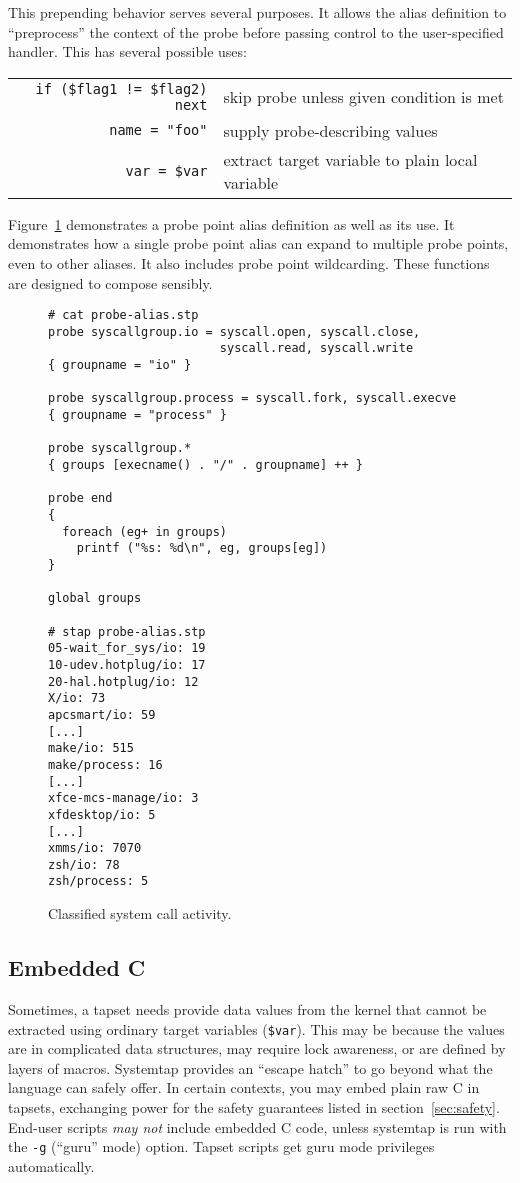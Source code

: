 \documentclass{article}
\newenvironment{boxedminipage}%
    {\begin{makeimage}\begin{center}\begin{Sbox}\begin{minipage}}%
    {\end{minipage}\end{Sbox}\fbox{\TheSbox}\end{center}\end{makeimage}}
\renewcommand{\nomenclature}[2]{}
\begin{document}
This prepending behavior serves several purposes.  It allows the alias
definition to ``preprocess'' the context of the probe before passing
control to the user-specified handler.  This has several possible uses:
\begin{tabular}{rl}
\verb+if ($flag1 != $flag2) next+ & skip probe unless given condition is met \\
\verb+name = "foo"+ & supply probe-describing values \\
\verb+var = $var+ & extract target variable to plain local variable \\ %
\end{tabular}

Figure~\ref{fig:probe-alias} demonstrates a probe point alias
definition as well as its use.  It demonstrates how a single probe
point alias can expand to multiple probe points, even to other
aliases.  It also includes probe point wildcarding.  These functions
are designed to compose sensibly.

\begin{figure}[!ht]
\begin{boxedminipage}{4.5in}
\begin{verbatim}
# cat probe-alias.stp
probe syscallgroup.io = syscall.open, syscall.close, 
                        syscall.read, syscall.write
{ groupname = "io" }

probe syscallgroup.process = syscall.fork, syscall.execve
{ groupname = "process" }

probe syscallgroup.* 
{ groups [execname() . "/" . groupname] ++ }

probe end
{
  foreach (eg+ in groups)
    printf ("%s: %d\n", eg, groups[eg])
}

global groups

# stap probe-alias.stp
05-wait_for_sys/io: 19
10-udev.hotplug/io: 17
20-hal.hotplug/io: 12
X/io: 73
apcsmart/io: 59
[...]
make/io: 515
make/process: 16
[...]
xfce-mcs-manage/io: 3
xfdesktop/io: 5
[...]
xmms/io: 7070
zsh/io: 78
zsh/process: 5
\end{verbatim}
\end{boxedminipage}
\caption{Classified system call activity.}
\label{fig:probe-alias}
\end{figure}

\subsection{Embedded C}
\label{embedded-c}

Sometimes, a tapset needs provide data values from the kernel that
cannot be extracted using ordinary target variables (\verb+$var+).  %
This may be because the values are in complicated data structures, may
require lock awareness, or are defined by layers of macros.  Systemtap
provides an ``escape hatch'' to go beyond what the language can safely
offer.  In certain contexts, you may embed plain raw C in tapsets,
exchanging power for the safety guarantees listed in
section~\ref{sec:safety}.  End-user scripts {\em may not} include
embedded C code, unless systemtap is run with the \verb+-g+ (``guru''
mode) option.  Tapset scripts get guru mode privileges automatically.
\nomenclature{embedded C}{Special syntax permitting tapsets to include
literal C code.}
\end{document}
